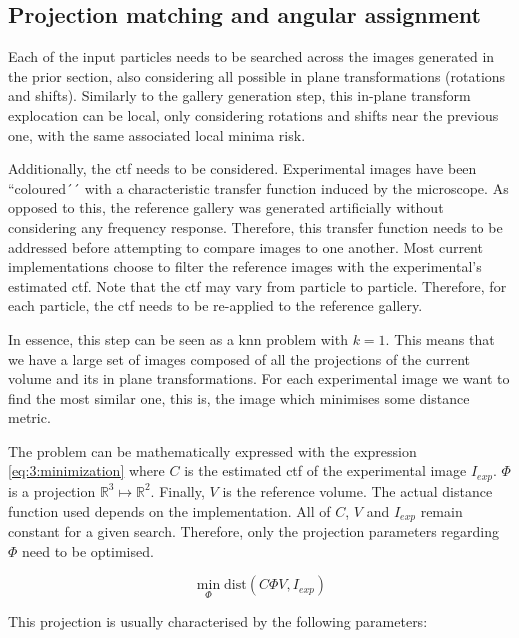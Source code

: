\documentclass[../main.tex]{subfiles}
\begin{document}
\subsection{Projection matching and angular assignment}
Each of the input particles needs to be searched across the images generated in the prior section, also considering all possible in plane transformations (rotations and shifts). Similarly to the gallery generation step, this in-plane transform explocation can be local, only considering rotations and shifts near the previous one, with the same associated local minima risk.

Additionally, the \gls{ctf} needs to be considered. Experimental images have been ``coloured´´ with a characteristic transfer function induced by the microscope. As opposed to this, the reference gallery was generated artificially without considering any frequency response. Therefore, this transfer function needs to be addressed before attempting to compare images to one another. Most current implementations choose to filter the reference images with the experimental's estimated \gls{ctf}. Note that the \gls{ctf} may vary from particle to particle. Therefore, for each particle, the \gls{ctf} needs to be re-applied to the reference gallery.

In essence, this step can be seen as a \gls{knn} problem with $k=1$. This means that we have a large set of images composed of all the projections of the current volume and its in plane transformations. For each experimental image we want to find the most similar one, this is, the image which minimises some distance metric.

The problem can be mathematically expressed with the expression \ref{eq:3:minimization} where $C$ is the estimated \gls{ctf} of the experimental image $I_{exp}$. $\Phi$ is a projection $\mathbb{R}^3 \mapsto \mathbb{R}^2$. Finally, $V$ is the reference volume. The actual distance function used depends on the implementation. All of $C$, $V$ and $I_{exp}$ remain constant for a given search. Therefore, only the projection parameters regarding $\Phi$ need to be optimised.

\begin{equation}\label{eq:3:minimization}
    \min_\Phi \text{dist}(C\Phi V, I_{exp})
\end{equation}

This projection is usually characterised by the following parameters:
\end{document}
